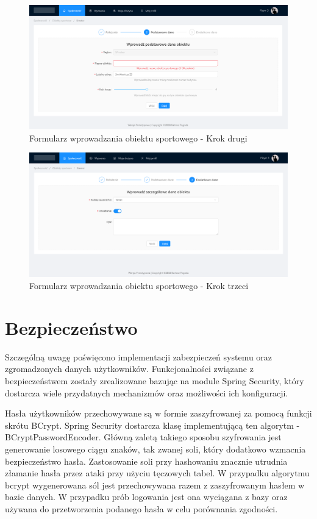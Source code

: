 \begin{figure}[H]
\centering
\includegraphics[width=\linewidth]{06-implementacja/rys/form2.PNG}
\caption{Formularz wprowadzania obiektu sportowego - Krok drugi}
\label{fig:sample-form}
\end{figure}




\begin{figure}[H]
\centering
\includegraphics[width=\linewidth]{06-implementacja/rys/form3.PNG}
\caption{Formularz wprowadzania obiektu sportowego - Krok trzeci}
\label{fig:sample-form}
\end{figure}


\section{Bezpieczeństwo}

Szczególną uwagę poświęcono implementacji zabezpieczeń systemu oraz zgromadzonych danych użytkowników. Funkcjonalności związane z bezpieczeństwem zostały zrealizowane bazując na module Spring Security, który dostarcza wiele przydatnych mechanizmów oraz możliwości ich konfiguracji.

Hasła użytkowników przechowywane są w formie zaszyfrowanej za pomocą funkcji skrótu BCrypt. Spring Security dostarcza klasę implementującą ten algorytm - BCryptPasswordEncoder. Główną zaletą takiego sposobu szyfrowania jest generowanie losowego ciągu znaków, tak zwanej soli, który dodatkowo wzmacnia bezpieczeństwo hasła. Zastosowanie soli przy hashowaniu znacznie utrudnia złamanie hasła przez ataki przy użyciu tęczowych tabel. W przypadku algorytmu bcrypt wygenerowana sól jest przechowywana razem z zaszyfrowanym hasłem w bazie danych. W przypadku prób logowania jest ona wyciągana z bazy oraz używana do przetworzenia podanego hasła w celu porównania zgodności.


